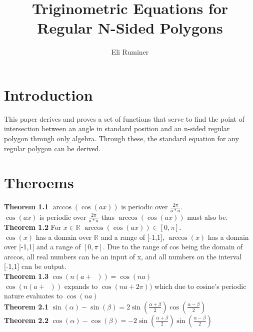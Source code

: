 \documentclass[11pt]{article}
\title{Triginometric Equations for Regular N-Sided Polygons}
\author{Eli Ruminer}
\date{}
\DeclareMathOperator{\period}{\frac{2\pi}{n}}
\begin{document}
\begin{titlepage}
\clearpage\maketitle
\thispagestyle{empty}
\end{titlepage}

\tableofcontents
\newpage

\section{Introduction}
This paper derives and proves a set of functions that serve to find the point of intersection between an angle in standard position and an n-sided regular polygon through only algebra. Through these, the standard equation for any regular polygon can be derived.


\section{Theroems}
\textbf{Theorem 1.1} \(\arccos(\cos(ax))\) is periodic over \(\frac{2\pi}{a*n}\).\\
\(\cos(ax)\) is periodic over \(\frac{2\pi}{a*n}\) thus \(\arccos(\cos(ax))\) must also be.\\
\textbf{Theorem 1.2} For \(x\in\mathbb{R}\) \(\arccos(\cos(ax))\in[0,\pi]\).\\
\(\cos(x)\) has a domain over \(\mathbb{R}\) and a range of [-1,1], \(\arccos(x)\) has a domain over [-1,1] and a range of \([0,\pi]\). Due to the range of cos being the domain of arccos, all real numbers can be an input of x, and all numbers on the interval [-1,1] can be output.\\
\textbf{Theorem 1.3} \(\cos(n(a+\period))=\cos(na)\)\\
\(\cos(n(a+\period))\) expands to \(\cos(na+2\pi))\) which due to cosine's periodic nature evaluates to \(\cos(na)\)\\
\textbf{Theorem 2.1} \(\sin(\alpha)-\sin(\beta)=2\sin(\frac{\alpha+\beta}{2})\cos(\frac{\alpha-\beta}{2})\)\\
\textbf{Theorem 2.2} \(\cos(\alpha)-\cos(\beta)=-2\sin(\frac{\alpha+\beta}{2})\sin(\frac{\alpha-\beta}{2})\)
\end{document}
